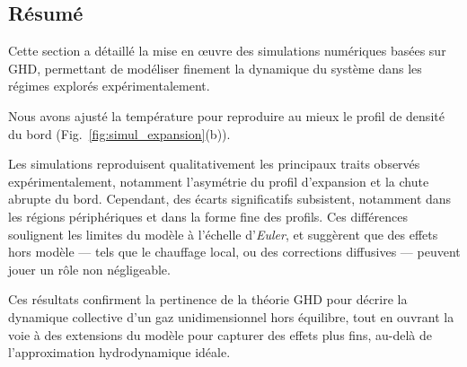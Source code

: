 \subsection*{Résumé}

Cette section a détaillé la mise en œuvre des simulations numériques basées sur \gls{GHD}, permettant de modéliser finement la dynamique du système dans les régimes explorés expérimentalement.

\medskip

Nous avons ajusté la température pour reproduire au mieux le profil de densité du bord (Fig.~\ref{fig:simul_expansion}(b)).

Les simulations reproduisent qualitativement les principaux traits observés expérimentalement, notamment l’asymétrie du profil d’expansion et la chute abrupte du bord. Cependant, des écarts significatifs subsistent, notamment dans les régions périphériques et dans la forme fine des profils. Ces différences soulignent les limites du modèle à l’échelle d’\emph{Euler}, et suggèrent que des effets hors modèle — tels que  le chauffage local, ou des corrections diffusives — peuvent jouer un rôle non négligeable.

\medskip

Ces résultats confirment la pertinence de la théorie \gls{GHD} pour décrire la dynamique collective d’un gaz unidimensionnel hors équilibre, tout en ouvrant la voie à des extensions du modèle pour capturer des effets plus fins, au-delà de l’approximation hydrodynamique idéale.

